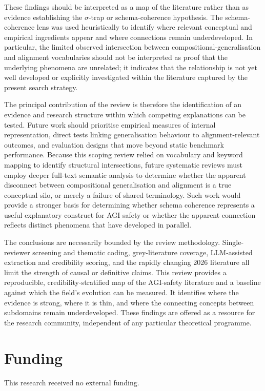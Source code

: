 These findings should be interpreted as a map of the literature rather than as evidence establishing the $\sigma$-trap or schema-coherence hypothesis. The schema-coherence lens was used heuristically to identify where relevant conceptual and empirical ingredients appear and where connections remain underdeveloped. In particular, the limited observed intersection between compositional-generalisation and alignment vocabularies should not be interpreted as proof that the underlying phenomena are unrelated; it indicates that the relationship is not yet well developed or explicitly investigated within the literature captured by the present search strategy.

The principal contribution of the review is therefore the identification of an evidence and research structure within which competing explanations can be tested. Future work should prioritise empirical measures of internal representation, direct tests linking generalisation behaviour to alignment-relevant outcomes, and evaluation designs that move beyond static benchmark performance. Because this scoping review relied on vocabulary and keyword mapping to identify structural intersections, future systematic reviews must employ deeper full-text semantic analysis to determine whether the apparent disconnect between compositional generalisation and alignment is a true conceptual silo, or merely a failure of shared terminology. Such work would provide a stronger basis for determining whether schema coherence represents a useful explanatory construct for AGI safety or whether the apparent connection reflects distinct phenomena that have developed in parallel.

The conclusions are necessarily bounded by the review methodology. Single-reviewer screening and thematic coding, grey-literature coverage, LLM-assisted extraction and credibility scoring, and the rapidly changing 2026 literature all limit the strength of causal or definitive claims. This review provides a reproducible, credibility-stratified map of the AGI-safety literature and a baseline against which the field's evolution can be measured. It identifies where the evidence is strong, where it is thin, and where the connecting concepts between subdomains remain underdeveloped. These findings are offered as a resource for the research community, independent of any particular theoretical programme.

\section*{Funding}
\noindent This research received no external funding.

